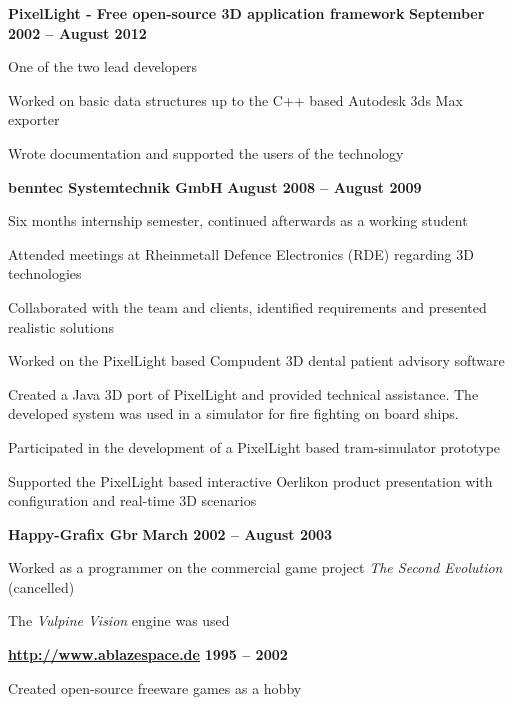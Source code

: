 \documentclass[margin,line]{Ofenberg_Resume}
\begin{document}
\begin{resume}
	\textbf{PixelLight - Free open-source 3D application framework} \hfill \textbf{September 2002 -- August 2012}\vspace{-3mm}\\\vspace{-1mm}%
	\begin{list2}
		\item One of the two lead developers
		\item Worked on basic data structures up to the C++ based Autodesk 3ds Max exporter
		\item Wrote documentation and supported the users of the technology
	\end{list2}\vspace{-1.5mm}
	\textbf{benntec Systemtechnik GmbH} \hfill \textbf{August 2008 -- August 2009}\vspace{-3mm}\\\vspace{-1mm}%
	\begin{list2}
		\item Six months internship semester, continued afterwards as a working student
		\item Attended meetings at Rheinmetall Defence Electronics (RDE) regarding 3D technologies
		\item Collaborated with the team and clients, identified requirements and presented realistic solutions
		\item Worked on the PixelLight based Compudent 3D dental patient advisory software
		\item Created a Java 3D port of PixelLight and provided technical assistance. The developed system was used in a simulator for fire fighting on board ships.
		\item Participated in the development of a PixelLight based tram-simulator prototype
		\item Supported the PixelLight based interactive Oerlikon product presentation with configuration and real-time 3D scenarios
	\end{list2}\vspace{-1.5mm}
	\textbf{Happy-Grafix Gbr} \hfill \textbf{March 2002 -- August 2003}\vspace{-3mm}\\\vspace{-1mm}%
	\begin{list2}
		\item Worked as a programmer on the commercial game project \emph{The Second Evolution} (cancelled)
		\item The \emph{Vulpine Vision} engine was used
	\end{list2}\vspace{-1.5mm}
	\textbf{\url{http://www.ablazespace.de}} \hfill \textbf{1995 -- 2002}\vspace{-3mm}\\\vspace{-1mm}%
	\begin{list2}
		\item Created open-source freeware games as a hobby
	\end{list2}\vspace{-1.5mm}



\end{resume}
\end{document}
